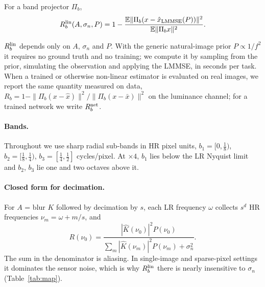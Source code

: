 \begin{definition}
For a band projector $\Pi_b$,
\[
R_b^{\mathrm{lin}}(A,\sigma_n,P)=1-\frac{\mathbb{E}\|\Pi_b(x-\hat x_{\mathrm{LMMSE}}(P))\|^2}{\mathbb{E}\|\Pi_b x\|^2}.
\]
\end{definition}
$R_b^{\mathrm{lin}}$ depends only on $A$, $\sigma_n$ and $P$. With the generic natural-image
prior $P\propto1/f^2$ it requires no ground truth and no training; we compute
it by sampling from the prior, simulating the observation and applying the
LMMSE, in seconds per task. When a trained or otherwise non-linear estimator
is evaluated on real images, we report the same quantity measured on data,
$R_b=1-\|\Pi_b(x-\hat x)\|^2/\|\Pi_b(x-\bar x)\|^2$ on the luminance channel;
for a trained network we write $R_b^{\mathrm{net}}$.

\paragraph{Bands.} Throughout we use sharp radial sub-bands in HR pixel units,
$b_1=[0,\tfrac18)$, $b_2=[\tfrac18,\tfrac14)$, $b_3=[\tfrac14,\tfrac12]$
cycles/pixel. At $\times4$, $b_1$ lies below the LR Nyquist limit and
$b_2$, $b_3$ lie one and two octaves above it.

\paragraph{Closed form for decimation.} For $A$ = blur $K$ followed by
decimation by $s$, each LR frequency $\omega$ collects $s^d$ HR frequencies
$\nu_m=\omega+m/s$, and
\begin{equation}\label{eq:alias}
R(\nu_0)=\frac{|\hat K(\nu_0)|^2P(\nu_0)}{\sum_m|\hat K(\nu_m)|^2P(\nu_m)+\sigma_n^2}.
\end{equation}
The sum in the denominator is aliasing. In single-image and sparse-pixel
settings it dominates the sensor noise, which is why $R_b^{\mathrm{lin}}$ there is nearly
insensitive to $\sigma_n$ (Table~\ref{tab:map}).
